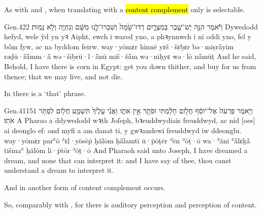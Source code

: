 
\begin{paper}
	As with  and , when translating  with a \hl{content complement} only  is selectable.
\end{paper}

\begin{example}{Gen.}{42}{2}{}{}
	\quoling
	{וַיֹּ֕אמֶר הִנֵּ֣ה   יֶשׁ־שֶׁ֖בֶר בְּמִצְרָ֑יִם רְדוּ־שָׁ֙מָּה֙ וְשִׁבְרוּ־לָ֣נוּ מִשָּׁ֔ם וְנִחְיֶ֖ה וְלֹ֥א נָמֽוּת׃}
	{Dywedodd hefyd, wele   ŷd yn yꝛ Aipht, ewch i wared yno, a phꝛynnwch i ni oddi yno, fel y bôm fyw, ac na byddom feirw.}
	{way·yōmɛr hinnē   yɛš·šɛḇɛr bə·miṣrå̄yim rəḏū·šå̄mm·å̄ wə·šiḇrū·l·å̄nū miš·šå̄m wə·niḥyɛ wə·lō nå̄mūṯ}
	{And he said, Behold, I have   there is corn in Egypt: get you down thither, and buy for us from thence; that we may live, and not die.}
\end{example}
\begin{paper}
	\begin{leftbar}
		\explain In  there is a  ‘that’ phrase.
	\end{leftbar}
\end{paper}

\begin{example}{Gen.}{41}{15}{1}{}
	\quoling
	{וַיֹּ֤אמֶר פַּרְעֹה֙ אֶל־יֹוסֵ֔ף חֲלֹ֣ום חָלַ֔מְתִּי וּפֹתֵ֖ר אֵ֣ין אֹתֹ֑ו וַאֲנִ֗י  עָלֶ֙יךָ֙  תִּשְׁמַ֥ע חֲלֹ֖ום לִפְתֹּ֥ר אֹתֹֽו׃}
	{A Pharao a ddywedodd wꝛth Joſeph, bꝛeuddwydiais freuddwyd, ac nid [oes] ai deonglo ef: ond myfi a   am danat ti, y gwꝛandewi freuddwyd iw ddeonglu.}
	{way·yōmɛr parʿō ʾɛl·yōsēp̄ ḥălōm ḥå̄lamtī ū·p̄ōṯēr ʾēn ʾōṯ·ō wa·ʾănī  ʿå̄lɛḵå̄  tišmaʿ ḥălōm li·p̄tōr ʾōṯ·ō}
	{And Pharaoh said unto Joseph, I have dreamed a dream, and  none that can interpret it: and I have  say of thee,  thou canst understand a dream to interpret it.}
\end{example}
\begin{paper}
	\begin{leftbar}
		\explain And in  another form of content complement occurs.
	\end{leftbar}
\end{paper}

\begin{paper}
	So, comparably with , for there is auditory perception and perception of content.
\end{paper}

